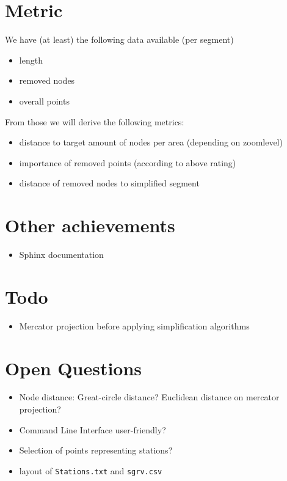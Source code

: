 \documentclass[twoside]{scrartcl}
\begin{document}
\section{Metric}
We have (at least) the following data available (per segment)

\begin{itemize}
\item length
\item removed nodes
\item overall points
\end{itemize}

From those we will derive the following metrics:

\begin{itemize}
\item distance to target amount of nodes per area (depending on zoomlevel)
\item importance of removed points (according to above rating)
\item distance of removed nodes to simplified segment
\end{itemize}

\section{Other achievements}
\begin{itemize}
    \item Sphinx documentation
\end{itemize}

\section{Todo}
\begin{itemize}
    \item Mercator projection before applying simplification algorithms
\end{itemize}

\section{Open Questions}
\begin{itemize}
    \item Node distance: Great-circle distance? Euclidean distance on mercator projection?
    \item Command Line Interface user-friendly?
    \item Selection of points representing stations?
    \item layout of \texttt{Stations.txt} and \texttt{sgrv.csv}
\end{itemize}
\end{document}
